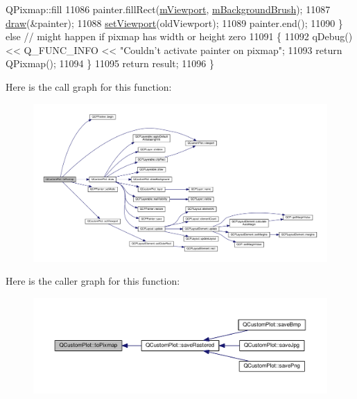 \begin{DoxyCode}
{       QPixmap::fill}
11086       painter.fillRect(\hyperlink{class_q_custom_plot_ac0a7c38a715526c257cff95774f83ab6}{mViewport}, \hyperlink{class_q_custom_plot_a3aef5de4ac012178e3293248e9c63737}{mBackgroundBrush});
11087     \hyperlink{class_q_custom_plot_ad7a7d878bf050f101a43008e7d8fdb52}{draw}(&painter);
11088     \hyperlink{class_q_custom_plot_a3f9bc4b939dd8aaba9339fd09f273fc4}{setViewport}(oldViewport);
11089     painter.end();
11090   \} \textcolor{keywordflow}{else} \textcolor{comment}{// might happen if pixmap has width or height zero}
11091   \{
11092     qDebug() << Q\_FUNC\_INFO << \textcolor{stringliteral}{"Couldn't activate painter on pixmap"};
11093     \textcolor{keywordflow}{return} QPixmap();
11094   \}
11095   \textcolor{keywordflow}{return} result;
11096 \}
\end{DoxyCode}


Here is the call graph for this function\+:\nopagebreak
\begin{figure}[H]
\begin{center}
\leavevmode
\includegraphics[width=350pt]{class_q_custom_plot_aabb974d71ce96c137dc04eb6eab844fe_cgraph}
\end{center}
\end{figure}




Here is the caller graph for this function\+:\nopagebreak
\begin{figure}[H]
\begin{center}
\leavevmode
\includegraphics[width=350pt]{class_q_custom_plot_aabb974d71ce96c137dc04eb6eab844fe_icgraph}
\end{center}
\end{figure}


